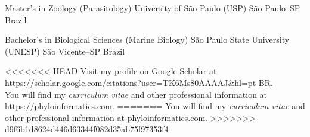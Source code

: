 \documentclass[11pt, letterpaper, sans]{moderncv}
\begin{document}
{Master's in Zoology (Parasitology)}
{University of São Paulo (USP)}
{São Paulo--SP}
{Brazil}
{}

{Bachelor's in Biological Sciences (Marine Biology)}
{São Paulo State University (UNESP)}
{São Vicente--SP}
{Brazil}
{}

<<<<<<< HEAD
Visit my profile on Google Scholar at \url{https://scholar.google.com/citations?user=TK6Ms80AAAAJ&hl=pt-BR}.\\
You will find my \textit{curriculum vitae} and other professional information at \url{https://phyloinformatics.com}.
=======
You will find my \textit{curriculum vitae} and other professional information at \href{https://phyloinformatics.com/members/Denis_Jacob_Machado.html}{phyloinformatics.com}.
>>>>>>> d9f6b1d8624d446d63344f082d35ab75f97353f4
\end{document}
